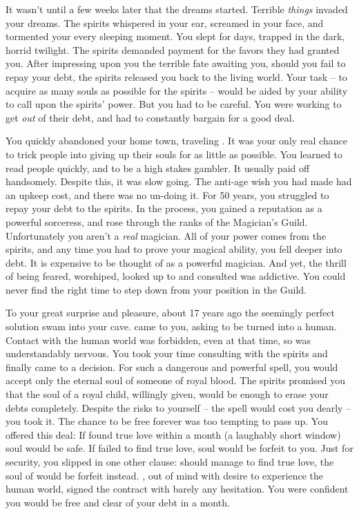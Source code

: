 \documentclass[char]{NeptuneBall}
\begin{document}
It wasn't until a few weeks later that the dreams started. Terrible \emph{things} invaded your dreams. The spirits whispered in your ear, screamed in your face, and tormented your every sleeping moment. You slept for days, trapped in the dark, horrid twilight. The spirits demanded payment for the favors they had granted you. After impressing upon you the terrible fate awaiting you, should you fail to repay your debt, the spirits released you back to the living world. Your task -- to acquire as many souls as possible for the spirits -- would be aided by your ability to call upon the spirits' power. But you had to be careful. You were working to get \emph{out} of their debt, and had to constantly bargain for a good deal.

You quickly abandoned your home town, traveling \pAtlantis{}. It was your only real chance to trick people into giving up their souls for as little as possible. You learned to read people quickly, and to be a high stakes gambler. It usually paid off handsomely. Despite this, it was slow going. The anti-age wish you had made had an upkeep cost, and there was no un-doing it. For 50 years, you struggled to repay your debt to the spirits. In the process, you gained a reputation as a powerful sorceress, and rose through the ranks of the Magician's Guild. Unfortunately you aren't a \emph{real} magician. All of your power comes from the spirits, and any time you had to prove your magical ability, you fell deeper into debt. It is expensive to be thought of as a powerful magician. And yet, the thrill of being feared, worshiped, looked up to and consulted was addictive. You could never find the right time to step down from your position in the Guild.

To your great surprise and pleasure, about 17 years ago the seemingly perfect solution swam into your cave. \cAriel{\Prince} \cAriel{} came to you, asking to be turned into a human. Contact with the human world was forbidden, even at that time, so \cAriel{} was understandably nervous. You took your time consulting with the spirits and finally came to a decision. For such a dangerous and powerful spell, you would accept only the eternal soul of someone of royal blood. The spirits promised you that the soul of a royal child, willingly given, would be enough to erase your debts completely. Despite the risks to yourself -- the spell would cost you dearly -- you took it. The chance to be free forever was too tempting to pass up. You offered \cAriel{} this deal: If \cAriel{\they} found true love within a month (a laughably short window) \cAriel{\their} soul would be safe. If \cAriel{} failed to find true love, \cAriel{\their} soul would be forfeit to you. Just for security, you slipped in one other clause: should \cAriel{} manage to find true love, the soul of \cAriel{\their}  would be forfeit instead. \cAriel{}, out of \cAriel{\their} mind with desire to experience the human world, signed the contract with barely any hesitation. You were confident you would be free and clear of your debt in a month.
\end{document}
